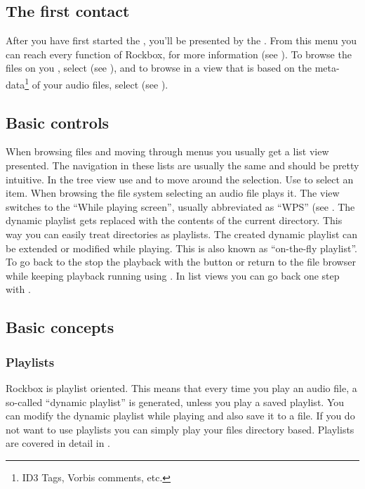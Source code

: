 \subsection{The first contact}

After you have first started the \dap{}, you'll be presented by the
. From this menu you can reach every function of Rockbox,
for more information (see ). To browse the files
on you \dap{}, select  (see ), and to
browse in a view that is based on the meta-data\footnote{ID3 Tags, Vorbis
comments, etc.} of your audio files, select  (see
).

\subsection{Basic controls}
When browsing files and moving through menus you usually get a list view
presented. The navigation in these lists are usually the same and should be
pretty intuitive.
In the tree view use \ActionStdNext{} and \ActionStdPrev{} to move around
the selection. Use \ActionStdOk{} to select an item. When browsing the file
system selecting an audio file plays it. The view switches to the ``While
playing screen'', usually abbreviated as ``WPS'' (see . The
dynamic playlist gets replaced with the contents of the current directory. This
way you can easily treat directories as playlists. The created dynamic playlist can
be extended or modified while playing. This is also known as
``on-the-fly playlist''.
To go back to the  stop the playback with the
\ActionWpsStop{} button or return to the file browser while keeping playback
running using \ActionWpsBrowse{}.
In list views you can go back one step with \ActionTreeParentDirectory.

\subsection{Basic concepts}
\subsubsection{Playlists}
Rockbox is playlist oriented. This means that every time you play an audio file,
a so-called ``dynamic playlist'' is generated, unless you play a saved
playlist. You can modify the dynamic playlist while playing and also save
it to a file. If you do not want to use playlists you can simply play your
files directory based.
Playlists are covered in detail in .

